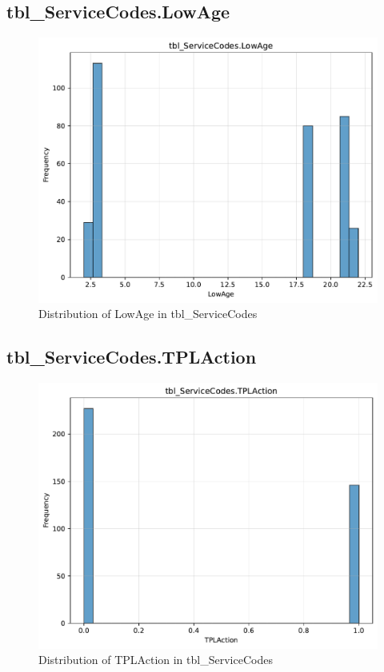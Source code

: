 \subsection{tbl\_ServiceCodes.LowAge}

\begin{figure}[htbp]
\centering
\includegraphics[width=\textwidth]{figures/dbo_tbl_ServiceCodes_LowAge.pdf}
\caption{Distribution of LowAge in tbl\_ServiceCodes}
\end{figure}\newpage

\subsection{tbl\_ServiceCodes.TPLAction}

\begin{figure}[htbp]
\centering
\includegraphics[width=\textwidth]{figures/dbo_tbl_ServiceCodes_TPLAction.pdf}
\caption{Distribution of TPLAction in tbl\_ServiceCodes}
\end{figure}\newpage

